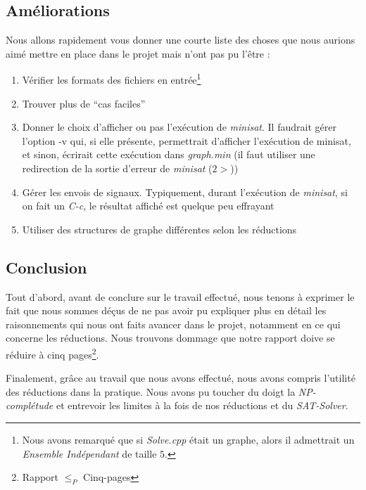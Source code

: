   \subsection{Améliorations}
  Nous allons rapidement vous donner une courte liste des choses que
  nous aurions aimé mettre en place dans le projet mais n'ont pas pu
  l'être :
  \begin{enumerate}
   \item Vérifier les formats des fichiers en entrée\footnote{Nous avons
	 remarqué que si \emph{Solve.cpp} était un graphe, alors il
	 admettrait un \emph{Ensemble Indépendant} de taille $5$.} 
   \item Trouver plus de ``cas faciles''
   \item Donner le choix d'afficher ou pas l'exécution de
	 \emph{minisat}. Il faudrait gérer l'option -v qui, si elle
	 présente, permettrait d'afficher l'exécution de minisat, et
	 sinon, écrirait cette exécution dans \emph{graph.min} (il faut
	 utiliser une redirection de la sortie d'erreur de
	 \emph{minisat} ($2>$))
   \item Gérer les envois de signaux. Typiquement, durant l'exécution de
	 \emph{minisat}, si on fait un \emph{C-c}, le résultat affiché
	 est quelque peu effrayant
   \item Utiliser des structures de graphe différentes selon les
	 réductions
  \end{enumerate}
  
  \subsection{Conclusion}
  Tout d'abord, avant de conclure sur le travail effectué, nous tenons à
  exprimer le fait que nous sommes déçus de ne pas avoir pu expliquer
  plus en détail les raisonnements qui nous ont faits avancer dans le
  projet, notamment en ce qui concerne les réductions. Nous trouvons
  dommage que notre rapport doive se réduire à cinq
  pages\footnote{Rapport $\leq_P$ Cinq-pages}.

  Finalement, grâce au travail que nous avons effectué, nous avons
  compris l'utilité des réductions dans la pratique. Nous avons pu
  toucher du doigt la \emph{NP-complétude} et entrevoir les limites à la
  fois de nos réductions et du \emph{SAT-Solver}.